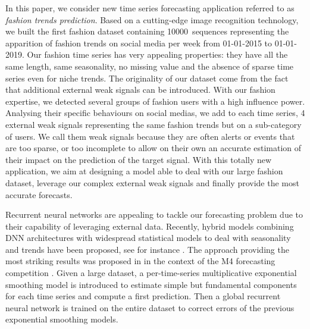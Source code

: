 \documentclass{article} %
\newcommand{\numberts}{10000}
\begin{document}
In this paper, we consider  new time series forecasting application referred to as {\em fashion trends prediction}. Based on a cutting-edge image recognition technology, we built the first fashion dataset containing \numberts\ sequences representing the apparition of fashion trends on social media per week from 01-01-2015 to 01-01-2019. Our fashion time series has very appealing properties: they have all the same length, same seasonality, no missing value and the absence of sparse time series even for niche trends. The originality of our dataset come from the fact that additional external weak signals can be introduced. With our fashion expertise, we detected several groups of fashion users with a high influence power. Analysing their specific behaviours on social medias, we add to each time series, 4 external weak signals representing the same fashion trends but on a sub-category of users. We call them weak signals because they are often alerts or events that are too sparse, or too incomplete to allow on their own an accurate estimation of their impact on the prediction of the target signal. With this totally new application, we aim at designing a model able to deal with our large fashion dataset, leverage our complex external weak signals and finally provide the most accurate forecasts.
 
Recurrent neural networks are appealing to tackle our forecasting problem due to their capability of leveraging external data.  Recently, hybrid models combining DNN architectures with widespread statistical models to deal with seasonality and trends have been proposed, see for instance  \citep{zhang2003time,jianwei2019novel,bandara2020lstm}. The approach providing the most striking results was proposed in  \citep{smyl2020hybrid} in the context of the M4 forecasting competition \citep{makridakis2020m4}.  Given a large dataset, a per-time-series multiplicative exponential smoothing model is introduced to estimate simple but fundamental components for each time series and compute a first prediction. Then a global recurrent neural network is trained on the entire dataset to correct errors of the previous exponential smoothing models. %

\end{document}
